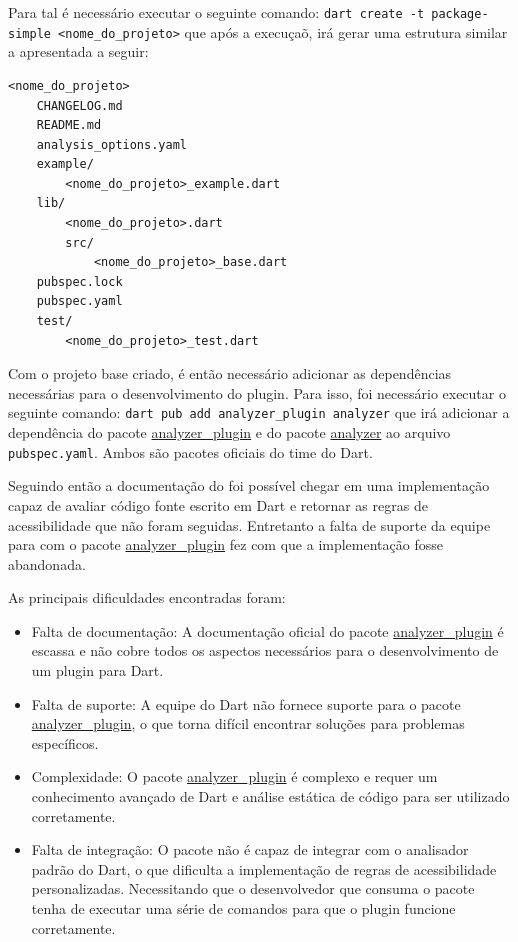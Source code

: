 Para tal é necessário executar o seguinte comando: \texttt{dart create -t package-simple <nome\_do\_projeto>} que após a execuçaõ, irá gerar uma estrutura similar a apresentada a seguir:

\begin{verbatim}
<nome_do_projeto>
	CHANGELOG.md
	README.md
	analysis_options.yaml
	example/
		<nome_do_projeto>_example.dart
	lib/
		<nome_do_projeto>.dart
		src/
			<nome_do_projeto>_base.dart
	pubspec.lock
	pubspec.yaml
	test/
		<nome_do_projeto>_test.dart
\end{verbatim}

Com o projeto base criado, é então necessário adicionar as dependências necessárias para o desenvolvimento do plugin. Para isso, foi necessário executar o seguinte comando: \texttt{dart pub add analyzer\_plugin analyzer} que irá adicionar a dependência do pacote \href{https://pub.dev/packages/analyzer_plugin}{analyzer\_plugin} e do pacote \href{https://pub.dev/packages/analyzer}{analyzer} ao arquivo \texttt{pubspec.yaml}. Ambos são pacotes oficiais do time do Dart.

Seguindo então a documentação do \cite{documentacaoanalyzerplugin} foi possível chegar em uma implementação capaz de avaliar código fonte escrito em Dart e retornar as regras de acessibilidade que não foram seguidas. Entretanto a falta de suporte da equipe para com o pacote \href{https://pub.dev/packages/analyzer_plugin}{analyzer\_plugin} fez com que a implementação fosse abandonada. 

As principais dificuldades encontradas foram: 

\begin{itemize}
	\item Falta de documentação: A documentação oficial do pacote \href{https://pub.dev/packages/analyzer_plugin}{analyzer\_plugin} é escassa e não cobre todos os aspectos necessários para o desenvolvimento de um plugin para Dart.
	\item Falta de suporte: A equipe do Dart não fornece suporte para o pacote \href{https://pub.dev/packages/analyzer_plugin}{analyzer\_plugin}, o que torna difícil encontrar soluções para problemas específicos.
	\item Complexidade: O pacote \href{https://pub.dev/packages/analyzer_plugin}{analyzer\_plugin} é complexo e requer um conhecimento avançado de Dart e análise estática de código para ser utilizado corretamente.
	\item Falta de integração: O pacote não é capaz de integrar com o analisador padrão do Dart, o que dificulta a implementação de regras de acessibilidade personalizadas. Necessitando que o desenvolvedor que consuma o pacote tenha de executar uma série de comandos para que o plugin funcione corretamente.
\end{itemize}

